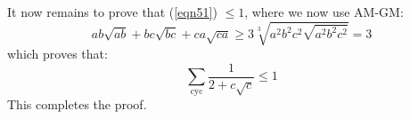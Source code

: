 \documentclass[a4paper, 12pt]{article}
\begin{document}
\begin{enumerate}
    It now remains to prove that (\ref{eqn51}) $ \leq 1$, where we now use AM-GM:
    $$  ab\sqrt {ab} + bc\sqrt {bc} + ca\sqrt {ca} \geq 3 \sqrt [3]{a^2b^2c^2\sqrt {a^2b^2c^2}} = 3 $$
    which proves that:
    $$ \sum_\textrm{cyc} \frac{1}{2 + c\sqrt{c}} \leq 1 $$
    This completes the proof.

	
\end{enumerate}
\end{document}
